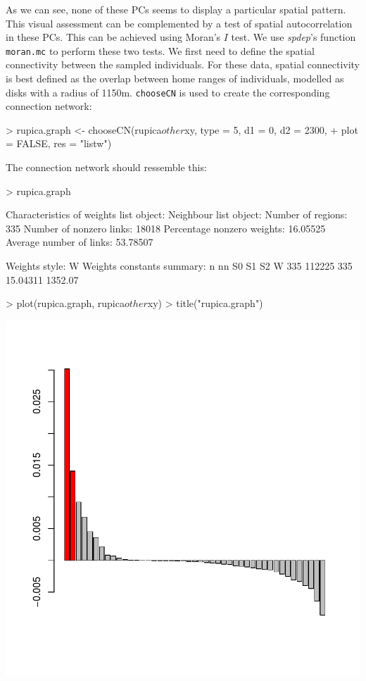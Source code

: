 \documentclass{article}
\begin{document}
\noindent As we can see, none of these PCs seems to display a particular spatial pattern.
This visual assessment can be complemented by a test of spatial autocorrelation in these PCs.
This can be achieved using Moran's $I$ test.
We use \textit{spdep}'s function \texttt{moran.mc} to perform these two tests.
We first need to define the spatial connectivity between the sampled individuals.
For these data, spatial connectivity is best defined as the overlap between home ranges of
individuals, modelled as disks with a radius of 1150m.
\texttt{chooseCN} is used to create the corresponding connection network:
\begin{Schunk}
\begin{Sinput}
> rupica.graph <- chooseCN(rupica$other$xy, type = 5, d1 = 0, d2 = 2300, 
+     plot = FALSE, res = "listw")
\end{Sinput}
\end{Schunk}
The connection network should ressemble this:
\begin{Schunk}
\begin{Sinput}
> rupica.graph
\end{Sinput}
\begin{Soutput}
Characteristics of weights list object:
Neighbour list object:
Number of regions: 335 
Number of nonzero links: 18018 
Percentage nonzero weights: 16.05525 
Average number of links: 53.78507 

Weights style: W 
Weights constants summary:
    n     nn  S0       S1      S2
W 335 112225 335 15.04311 1352.07
\end{Soutput}
\begin{Sinput}
> plot(rupica.graph, rupica$other$xy)
> title("rupica.graph")
\end{Sinput}
\end{Schunk}
\includegraphics{figs/spca-042}
\end{document}
